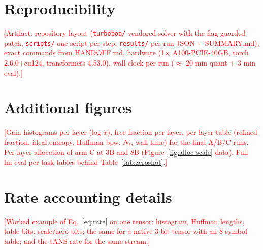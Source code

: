 \documentclass{article}
\newcommand{\tbd}[1]{\textcolor{red}{[#1]}}
\begin{document}
\section{Reproducibility}
\label{app:repro}

\tbd{Artifact: repository layout (\texttt{turboboa/} vendored solver with
the flag-guarded patch, \texttt{scripts/} one script per step,
\texttt{results/} per-run JSON + SUMMARY.md), exact commands from
HANDOFF.md, hardware (1$\times$ A100-PCIE-40GB, torch 2.6.0+cu124,
transformers 4.53.0), wall-clock per run ($\approx$ 20 min quant + 3 min
eval).}

\section{Additional figures}
\label{app:figs}

\tbd{Gain histograms per layer (log $x$), free fraction per layer,
per-layer table (refined fraction, ideal entropy, Huffman bpw, $N_\ell$,
wall time) for the final A/B/C runs. Per-layer allocation of arm C at 3B
and 8B (Figure~\ref{fig:alloc-scale} data). Full lm-eval per-task tables
behind Table~\ref{tab:zeroshot}.}



\section{Rate accounting details}
\label{app:rate}

\tbd{Worked example of Eq.~\eqref{eq:rate} on one tensor: histogram,
Huffman lengths, table bits, scale/zero bits; the same for a native
3-bit tensor with an 8-symbol table; and the tANS rate for the same
stream.}
\end{document}
